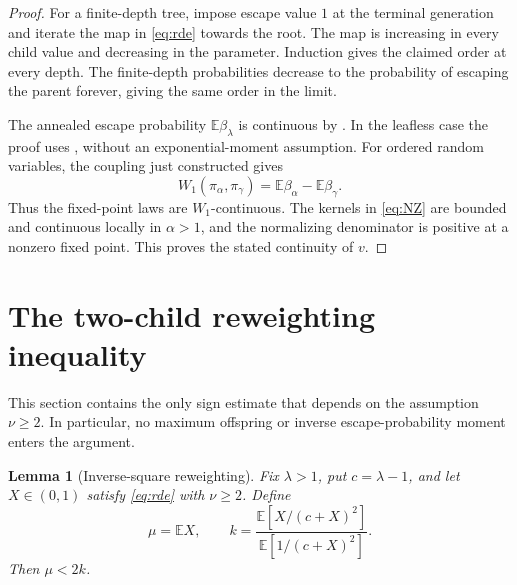 \documentclass[11pt,a4paper]{article}
\numberwithin{equation}{section}
\theoremstyle{notethm}
\newtheorem{lemma}[lemma]{Lemma}
\theoremstyle{definition}
\newcommand{\E}{\mathbb E}
\begin{document}
\begin{proof}
For a finite-depth tree, impose escape value $1$ at the terminal generation
and iterate the map in \eqref{eq:rde} towards the root. The map is increasing
in every child value and decreasing in the parameter. Induction gives the
claimed order at every depth. The finite-depth probabilities decrease to
the probability of escaping the parent forever, giving the same order in
the limit.

The annealed escape probability $\E\beta_\lambda$ is continuous by
\cite[Proposition~2.9]{BT}. In the leafless case the proof uses
\cite[Lemma~4.7]{BT}, without an exponential-moment assumption. For ordered
random variables, the coupling just constructed gives
\begin{equation}\label{eq:W1}
 W_1(\pi_\alpha,\pi_\gamma)
 =\E\beta_\alpha-\E\beta_\gamma.
\end{equation}
Thus the fixed-point laws are $W_1$-continuous. The kernels in
\eqref{eq:NZ} are bounded and continuous locally in $\alpha>1$, and the
normalizing denominator is positive at a nonzero fixed point. This proves
the stated continuity of $v$.
\end{proof}

\section{The two-child reweighting inequality}\label{sec:tilt}

This section contains the only sign estimate that depends on the assumption
$\nu\ge2$. In particular, no maximum offspring or inverse escape-probability
moment enters the argument.

\begin{lemma}[Inverse-square reweighting]\label{lem:tilt}
Fix $\lambda>1$, put $c=\lambda-1$, and let $X\in(0,1)$ satisfy
\eqref{eq:rde} with $\nu\ge2$. Define
\begin{equation}\label{eq:mu-k}
 \mu=\E X,\qquad
 k=\frac{\E[X/(c+X)^2]}{\E[1/(c+X)^2]}.
\end{equation}
Then $\mu<2k$.
\end{lemma}
\end{document}
